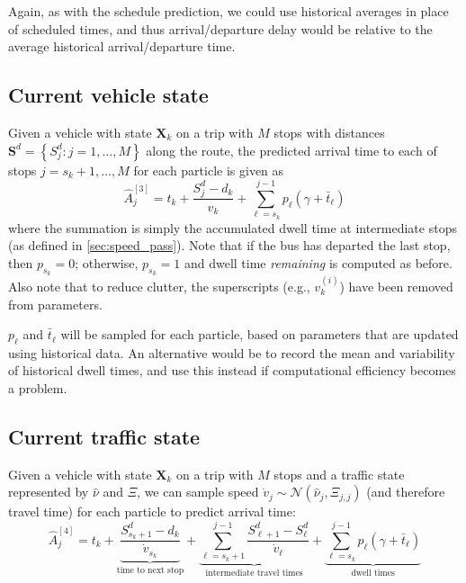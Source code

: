 \documentclass[14paper,twoside]{article}
\newcommand{\bX}{\mathbf{X}}
\newcommand{\bS}{\mathbf{S}}
\begin{document}
Again, as with the schedule prediction, we could use historical averages in place of scheduled times,
and thus arrival/departure delay would be relative to the average historical arrival/departure time.



\subsection{Current vehicle state}
\label{sec:pred-vehicle-state}

Given a vehicle with state $\bX_k$ on a trip with $M$ stops with distances
$\bS^d = \left\{S_j^d : j = 1, \ldots, M\right\}$ along the route,
the predicted arrival time to each of stops $j = s_k + 1, \ldots, M$ for each particle is given as
\begin{equation}
  \label{eq:pred-vehicle-state}
  \hat A_j^{[3]} = t_k + \frac{S_j^d - d_k}{v_k} + 
  \sum_{\ell = s_k}^{j-1} p_\ell \left( \gamma + \bar t_\ell \right)
\end{equation}
where the summation is simply the accumulated dwell time at intermediate stops
(as defined in \cref{sec:speed_pass}).
Note that if the bus has departed the last stop, then $p_{s_k} = 0$;
otherwise, $p_{s_k} = 1$ and dwell time \emph{remaining} is computed as before.
Also note that to reduce clutter, the superscripts (e.g., $v_k^{(i)}$) have been removed from parameters.

$p_\ell$ and $\bar t_\ell$ will be sampled for each particle, 
based on parameters that are updated using historical data.
An alternative would be to record the mean and variability of historical dwell times,
and use this instead if computational efficiency becomes a problem.


\subsection{Current traffic state}
\label{sec:pred-traffic-state}

Given a vehicle with state $\bX_k$ on a trip with $M$ stops and 
a traffic state represented by $\hat \nu$ and $\Xi$,
we can sample speed $\dot v_j \sim \mathcal{N}(\hat\nu_j, \Xi_{j,j})$ (and therefore travel time) for each particle 
to predict arrival time:
\begin{equation}
  \label{eq:pred-traffic-state}
  \hat A_j^{[4]} = t_k 
  + \underbrace{\frac{S_{s_k + 1}^d - d_k}{\dot v_{s_k}}}_{\text{time to next stop}}
  + \underbrace{\sum_{\ell = s_k + 1}^{j - 1} \frac{S_{\ell + 1}^d - S_\ell^d}{\dot v_\ell}}_{\text{intermediate travel times}}
  + \underbrace{\sum_{\ell = s_k}^{j-1} p_\ell \left( \gamma + \bar t_\ell \right)}_{\text{dwell times}}
\end{equation}
\end{document}
